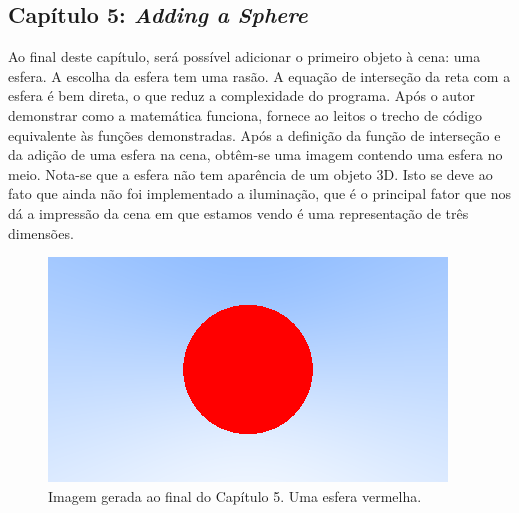 \documentclass[journal]{IEEEtran}
\begin{document}
\subsection*{Capítulo 5: \emph{Adding a Sphere}}
Ao final deste capítulo, será possível adicionar o primeiro objeto à cena: uma esfera. A escolha da esfera
tem uma rasão. A equação de interseção da reta com a esfera é bem direta, o que reduz a complexidade do
programa. Após o autor demonstrar como a matemática funciona, fornece ao leitos o trecho de código equivalente
às funções demonstradas. Após a definição da função de interseção e da adição de uma esfera na cena, obtêm-se
uma imagem contendo uma esfera no meio. Nota-se que a esfera não tem aparência de um objeto 3D. Isto se deve
ao fato que ainda não foi implementado a iluminação, que é o principal fator que nos dá a impressão da cena 
em que estamos vendo é uma representação de três dimensões.

\begin{figure}[ht]
  \centering
  \includegraphics[width=\linewidth]{media/img-1.03-red-sphere.png}
  \caption{Imagem gerada ao final do Capítulo 5. Uma esfera vermelha.}
  \label{img_red_sphere}
\end{figure}
\end{document}
